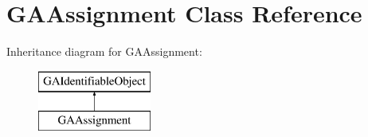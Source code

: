 \hypertarget{class_g_a_assignment}{}\section{G\+A\+Assignment Class Reference}
\label{class_g_a_assignment}
Inheritance diagram for G\+A\+Assignment\+:\begin{figure}[H]
\begin{center}
\leavevmode
\includegraphics[height=2.000000cm]{class_g_a_assignment}
\end{center}
\end{figure}
